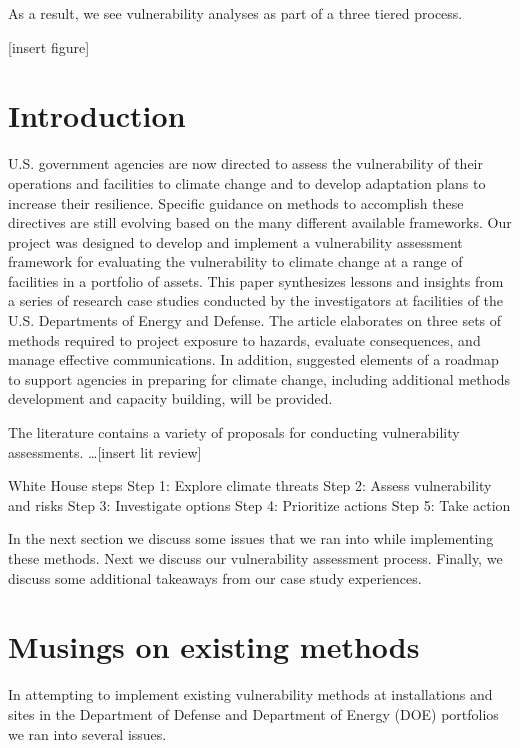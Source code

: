 \documentclass[10pt]{amsart}
\begin{document}
As a result, we see vulnerability analyses as part of a three tiered process. 

[insert figure]


\section{Introduction}
U.S. government agencies are now directed to assess the vulnerability of their operations and facilities to climate change and to develop adaptation plans to increase their resilience. 
Specific guidance on methods to accomplish these directives are still evolving based on the many different available frameworks. 
Our project was designed to develop and implement a vulnerability assessment framework for evaluating the vulnerability to climate change at a range of facilities in a portfolio of assets. 
This paper synthesizes lessons and insights from a series of research case studies conducted by the investigators at facilities of the U.S. Departments of Energy and Defense. 
The article elaborates on three sets of methods required to project exposure to hazards, evaluate consequences, and manage effective communications. 
In addition, suggested elements of a roadmap to support agencies in preparing for climate change, including additional methods development and capacity building, will be provided.

The literature contains a variety of proposals for conducting vulnerability assessments. 
\ldots [insert lit review]

White House steps
Step 1: Explore climate threats
Step 2: Assess vulnerability and risks
Step 3: Investigate options
Step 4: Prioritize actions
Step 5: Take action


In the next section we discuss some issues that we ran into while implementing these methods.
Next we discuss our vulnerability assessment process.
Finally, we discuss some additional takeaways from our case study experiences.

\section{Musings on existing methods}
In attempting to implement existing vulnerability methods at installations and sites in the Department of Defense and Department of Energy (DOE) portfolios we ran into several issues.
\end{document}
